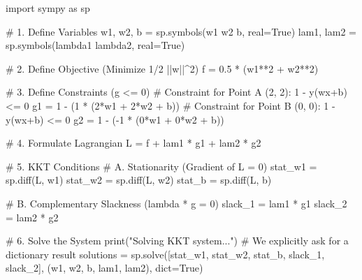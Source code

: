 \documentclass[
  letterpaper,
  DIV=11,
  numbers=noendperiod]{scrreprt}
\newenvironment{Shaded}{\begin{snugshade}}{\end{snugshade}}
\newcommand{\BuiltInTok}[1]{\textcolor[rgb]{0.00,0.23,0.31}{#1}}
\newcommand{\CommentTok}[1]{\textcolor[rgb]{0.37,0.37,0.37}{#1}}
\newcommand{\DecValTok}[1]{\textcolor[rgb]{0.68,0.00,0.00}{#1}}
\newcommand{\FloatTok}[1]{\textcolor[rgb]{0.68,0.00,0.00}{#1}}
\newcommand{\ImportTok}[1]{\textcolor[rgb]{0.00,0.46,0.62}{#1}}
\newcommand{\NormalTok}[1]{\textcolor[rgb]{0.00,0.23,0.31}{#1}}
\newcommand{\OperatorTok}[1]{\textcolor[rgb]{0.37,0.37,0.37}{#1}}
\newcommand{\StringTok}[1]{\textcolor[rgb]{0.13,0.47,0.30}{#1}}
\newcommand{\VariableTok}[1]{\textcolor[rgb]{0.07,0.07,0.07}{#1}}
\begin{document}
\begin{Shaded}
\begin{Highlighting}[]
\ImportTok{import}\NormalTok{ sympy }\ImportTok{as}\NormalTok{ sp}

\CommentTok{\# 1. Define Variables}
\NormalTok{w1, w2, b }\OperatorTok{=}\NormalTok{ sp.symbols(}\StringTok{\textquotesingle{}w1 w2 b\textquotesingle{}}\NormalTok{, real}\OperatorTok{=}\VariableTok{True}\NormalTok{)}
\NormalTok{lam1, lam2 }\OperatorTok{=}\NormalTok{ sp.symbols(}\StringTok{\textquotesingle{}lambda1 lambda2\textquotesingle{}}\NormalTok{, real}\OperatorTok{=}\VariableTok{True}\NormalTok{)}

\CommentTok{\# 2. Define Objective (Minimize 1/2 ||w||\^{}2)}
\NormalTok{f }\OperatorTok{=} \FloatTok{0.5} \OperatorTok{*}\NormalTok{ (w1}\OperatorTok{**}\DecValTok{2} \OperatorTok{+}\NormalTok{ w2}\OperatorTok{**}\DecValTok{2}\NormalTok{)}

\CommentTok{\# 3. Define Constraints (g \textless{}= 0)}
\CommentTok{\# Constraint for Point A (2, 2): 1 {-} y(wx+b) \textless{}= 0}
\NormalTok{g1 }\OperatorTok{=} \DecValTok{1} \OperatorTok{{-}}\NormalTok{ (}\DecValTok{1} \OperatorTok{*}\NormalTok{ (}\DecValTok{2}\OperatorTok{*}\NormalTok{w1 }\OperatorTok{+} \DecValTok{2}\OperatorTok{*}\NormalTok{w2 }\OperatorTok{+}\NormalTok{ b))}
\CommentTok{\# Constraint for Point B (0, 0): 1 {-} y(wx+b) \textless{}= 0}
\NormalTok{g2 }\OperatorTok{=} \DecValTok{1} \OperatorTok{{-}}\NormalTok{ (}\OperatorTok{{-}}\DecValTok{1} \OperatorTok{*}\NormalTok{ (}\DecValTok{0}\OperatorTok{*}\NormalTok{w1 }\OperatorTok{+} \DecValTok{0}\OperatorTok{*}\NormalTok{w2 }\OperatorTok{+}\NormalTok{ b))}

\CommentTok{\# 4. Formulate Lagrangian}
\NormalTok{L }\OperatorTok{=}\NormalTok{ f }\OperatorTok{+}\NormalTok{ lam1 }\OperatorTok{*}\NormalTok{ g1 }\OperatorTok{+}\NormalTok{ lam2 }\OperatorTok{*}\NormalTok{ g2}

\CommentTok{\# 5. KKT Conditions}
\CommentTok{\# A. Stationarity (Gradient of L = 0)}
\NormalTok{stat\_w1 }\OperatorTok{=}\NormalTok{ sp.diff(L, w1)}
\NormalTok{stat\_w2 }\OperatorTok{=}\NormalTok{ sp.diff(L, w2)}
\NormalTok{stat\_b  }\OperatorTok{=}\NormalTok{ sp.diff(L, b)}

\CommentTok{\# B. Complementary Slackness (lambda * g = 0)}
\NormalTok{slack\_1 }\OperatorTok{=}\NormalTok{ lam1 }\OperatorTok{*}\NormalTok{ g1}
\NormalTok{slack\_2 }\OperatorTok{=}\NormalTok{ lam2 }\OperatorTok{*}\NormalTok{ g2}

\CommentTok{\# 6. Solve the System}
\BuiltInTok{print}\NormalTok{(}\StringTok{"Solving KKT system..."}\NormalTok{)}
\CommentTok{\# We explicitly ask for a dictionary result}
\NormalTok{solutions }\OperatorTok{=}\NormalTok{ sp.solve([stat\_w1, stat\_w2, stat\_b, slack\_1, slack\_2], }
\NormalTok{                     (w1, w2, b, lam1, lam2), }\BuiltInTok{dict}\OperatorTok{=}\VariableTok{True}\NormalTok{)}


\end{Highlighting}
\end{Shaded}
\end{document}
